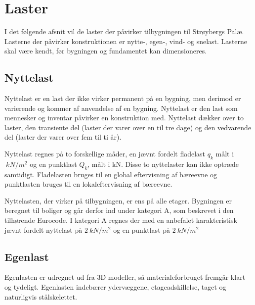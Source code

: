 \chapter{Laster}
I det følgende afsnit vil de laster der påvirker tilbygningen til Strøybergs Palæ. Lasterne der påvirker konstruktionen er nytte-, egen-, vind- og snelast. Lasterne skal være kendt, før bygningen og fundamentet kan dimensioneres.

\section{Nyttelast}
Nyttelast er en last der ikke virker permanent på en bygning, men derimod er varierende og kommer af anvendelse af en bygning. Nyttelast er den last som mennesker og inventar påvirker en konstruktion med. Nyttelast dækker over to laster, den transiente del (laster der varer over en til tre dage) og den vedvarende del (laster der varer over fem til ti år).

Nyttelast regnes på to forskellige måder, en jævnt fordelt fladelast $ q_{k} $ målt i $ \SI{}{kN/m^2} $ og en punktlast $ Q_{k} $, målt i kN. Disse to nyttelaster kan ikke optræde samtidigt. Fladelasten bruges til en global eftervisning af bæreevne og punktlasten bruges til en lokaleftervisning af bæreevne.


Nyttelasten, der virker på tilbygningen, er ens på alle etager. Bygningen er beregnet til boliger og går derfor ind under kategori A, som beskrevet i den tilhørende Eurocode. I kategori A regnes der med en anbefalet karakteristisk jævnt fordelt nyttelast på $\SI{2}{kN/m^2}$ og en punktlast på $\SI{2}{kN/m^2}$


\newpage

\section{Egenlast}
	Egenlasten er udregnet ud fra 3D modeller, så materialeforbruget fremgår klart og tydeligt. Egenlasten indebærer ydervæggene, etageadskillelse, taget og naturligvis stålskelettet.
	

